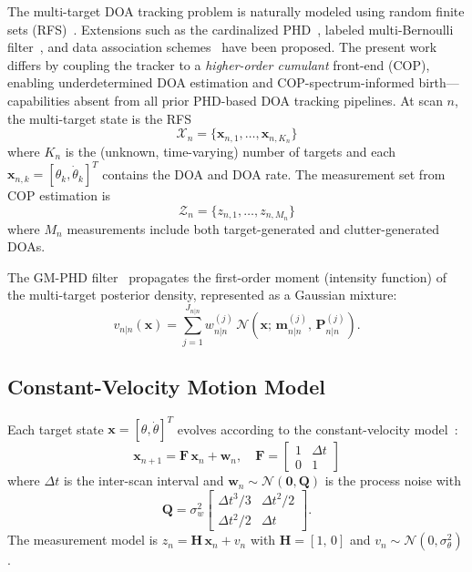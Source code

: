 \documentclass[journal]{IEEEtran}
\newcommand{\mat}[1]{\mathbf{#1}}
\begin{document}
The multi-target DOA tracking problem is naturally modeled using random finite sets (RFS)~\cite{mahler2003phd,mahler2007statistical}. Extensions such as the cardinalized PHD~\cite{vo2007cphd}, labeled multi-Bernoulli filter~\cite{vo2014lmb}, and data association schemes~\cite{panta2009gmphd,georgescu2012phd_doa} have been proposed. The present work differs by coupling the tracker to a \emph{higher-order cumulant} front-end (COP), enabling underdetermined DOA estimation and COP-spectrum-informed birth---capabilities absent from all prior PHD-based DOA tracking pipelines. At scan $n$, the multi-target state is the RFS
\begin{equation}
\mathcal{X}_n = \{\mat{x}_{n,1}, \ldots, \mat{x}_{n,K_n}\}
\end{equation}
where $K_n$ is the (unknown, time-varying) number of targets and each $\mat{x}_{n,k} = [\theta_k, \dot{\theta}_k]^T$ contains the DOA and DOA rate. The measurement set from COP estimation is
\begin{equation}
\mathcal{Z}_n = \{z_{n,1}, \ldots, z_{n,M_n}\}
\end{equation}
where $M_n$ measurements include both target-generated and clutter-generated DOAs.

The GM-PHD filter~\cite{vo2006gmphd} propagates the first-order moment (intensity function) of the multi-target posterior density, represented as a Gaussian mixture:
\begin{equation}
v_{n|n}(\mat{x}) = \sum_{j=1}^{J_{n|n}} w_{n|n}^{(j)}\,\mathcal{N}(\mat{x};\, \mat{m}_{n|n}^{(j)},\, \mat{P}_{n|n}^{(j)}).
\label{eq:phd_gm}
\end{equation}

\subsection{Constant-Velocity Motion Model}

Each target state $\mat{x} = [\theta, \dot{\theta}]^T$ evolves according to the constant-velocity model~\cite{simon2006optimal}:
\begin{equation}
\mat{x}_{n+1} = \mat{F}\,\mat{x}_n + \mat{w}_n, \quad
\mat{F} = \begin{bmatrix} 1 & \Delta t \\ 0 & 1 \end{bmatrix}
\label{eq:motion_model}
\end{equation}
where $\Delta t$ is the inter-scan interval and $\mat{w}_n \sim \mathcal{N}(\mat{0}, \mat{Q})$ is the process noise with
\begin{equation}
\mat{Q} = \sigma_w^2 \begin{bmatrix} \Delta t^3/3 & \Delta t^2/2 \\ \Delta t^2/2 & \Delta t \end{bmatrix}.
\label{eq:process_noise}
\end{equation}
The measurement model is $z_n = \mat{H}\,\mat{x}_n + v_n$ with $\mat{H} = [1,\, 0]$ and $v_n \sim \mathcal{N}(0, \sigma_\theta^2)$.
\end{document}
